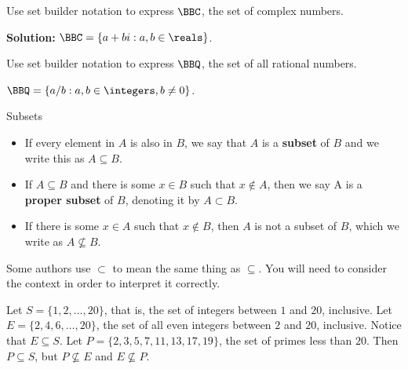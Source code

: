 \vspace*{-.1in} %

\begin{exa}
Use set builder notation to express $\BBC$, the set of complex numbers.

{\bf Solution:} 
$\BBC = \{a+bi : a,b\in\reals \}$.
\end{exa}

\begin{exer}
Use set builder notation to express $\BBQ$, the set of all rational numbers.
\answerline
\begin{answer}
$\BBQ = \{a/b : a,b\in\integers,b\neq 0 \}$.
\end{answer}
\end{exer}

\begin{df}
Subsets

\begin{itemize}
\item
If every element in $A$ is also in $B$, we say that 
$A$ is a {\bf subset} of $B$ and we write this as 
$A \subseteq B$.  
\item
If $A\subseteq B$ and there is some $x\in B$ such that $x\not\in A$,
then we say A is a {\bf proper subset} of $B$, denoting it by $A\subset B$.
\item
If there is some $x \in A$ such that $x
\not\in B$, then $A$ is not a subset of $B$, which we write as $A
\not\subseteq B.$ 
\end{itemize}
\end{df}

\begin{rem}
Some authors use $\subset$ to mean the same thing as $\subseteq$. 
You will need to consider the context in order to interpret it correctly.
\end{rem}


\begin{exa}
Let $S = \{1, 2, \ldots, 20\}$, that is, the set of integers
between $1$ and $20$, inclusive. 
Let $E = \{2, 4, 6, \ldots , 20\}$, the set of all even integers between $2$ and $20$, inclusive. 
Notice that $E\subseteq S$.
Let $P = \{2, 3, 5, 7, 11, 13, 17, 19\}$, the set of primes less than $20$. 
Then $P\subseteq S$, but $P\not\subseteq E$ and $E\not\subseteq P$.
\end{exa}


